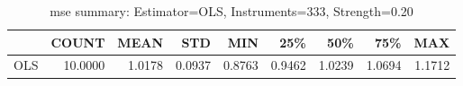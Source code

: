 \begin{table}[ht]
\centering
\caption{mse summary: Estimator=OLS, Instruments=333, Strength=0.20}
\begin{tabular}{lrrrrrrrr}
\toprule
 & COUNT & MEAN & STD & MIN & 25\% & 50\% & 75\% & MAX \\
\midrule
OLS & 10.0000 & 1.0178 & 0.0937 & 0.8763 & 0.9462 & 1.0239 & 1.0694 & 1.1712 \\
\bottomrule
\end{tabular}
\end{table}
